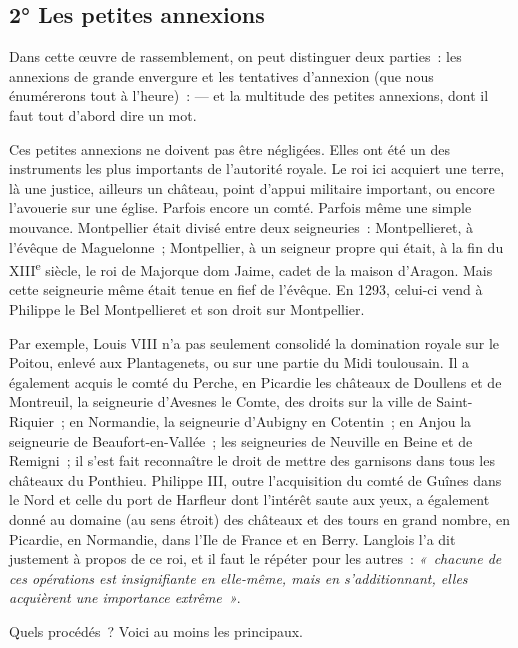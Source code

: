 \documentclass[french,twoside]{book} %
\begin{document}
\subsection[{2° Les petites annexions}]{2° Les petites annexions}
\label{c03c2}
\noindent Dans cette œuvre de rassemblement, on peut distinguer deux parties : les annexions de grande envergure et les tentatives d’annexion (que nous énumérerons tout à l’heure) : — et la multitude des petites annexions, dont il faut tout d’abord dire un mot.\par
Ces petites annexions ne doivent pas être négligées. Elles ont été un des instruments les plus importants de l’autorité royale. Le roi ici acquiert une terre, là une justice, ailleurs un château, point d’appui militaire important, ou encore l’avouerie sur une église. Parfois encore un comté. Parfois même une simple mouvance. Montpellier était divisé entre deux seigneuries : Montpellieret, à l’évêque de Maguelonne ; Montpellier, à un seigneur propre qui était, à la fin du XIII\textsuperscript{e} siècle, le roi de Majorque dom Jaime, cadet de la maison d’Aragon. Mais cette seigneurie même était tenue en fief de l’évêque. En 1293, celui-ci vend à Philippe le Bel Montpellieret et son droit sur Montpellier.\par
Par exemple, Louis VIII n’a pas seulement consolidé la domination royale sur le Poitou, enlevé aux Plantagenets, ou sur une partie du Midi toulousain. Il a également acquis le comté du Perche, en Picardie les châteaux de Doullens et de Montreuil, la seigneurie  
\label{p20} d’Avesnes le Comte, des droits sur la ville de Saint-Riquier ; en Normandie, la seigneurie d’Aubigny en Cotentin ; en Anjou la seigneurie de Beaufort-en-Vallée ; les seigneuries de Neuville en Beine et de Remigni ; il s’est fait reconnaître le droit de mettre des garnisons dans tous les châteaux du Ponthieu. Philippe III, outre l’acquisition du comté de Guînes dans le Nord et celle du port de Harfleur dont l’intérêt saute aux yeux, a également donné au domaine (au sens étroit) des châteaux et des tours en grand nombre, en Picardie, en Normandie, dans l’Ile de France et en Berry. Langlois l’a dit justement à propos de ce roi, et il faut le répéter pour les autres : \emph{« chacune de ces opérations est insignifiante en elle-même, mais en s’additionnant, elles acquièrent une importance extrême »}.\par
Quels procédés ? Voici au moins les principaux.\par
\bigbreak
\end{document}
